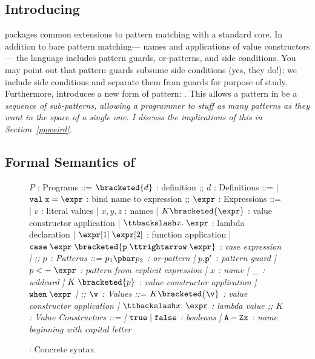 \documentclass[manuscript,screen,review, 12pt, nonacm]{acmart}
\begin{document}
\subsection{Introducing \PPlus}
\label{pplus}

    \PPlus packages common extensions to pattern matching with a standard core.
    In addition to bare pattern matching— names and applications of value
    constructors— the language includes pattern guards, or-patterns, and side
    conditions. You may point out that pattern guards subsume side conditions
    (yes, they do!); we include side conditions and separate them from guards
    for purpose of study. Furthermore, \PPlus introduces a new form of pattern:
    \pcommap. This allows a pattern in \PPlus be a \it{sequence} of
    sub-patterns, allowing a programmer to stuff as many patterns as they want
    in the space of a single one. I discuss the implications of this in
    Section~\ref{ppweird}.

\subsection{Formal Semantics of \PPlus}

\begin{figure}
\begin{center}
\begin{bnf}
$P$ : \textsf{Programs} ::=
$\bracketed{d}$ : definition
;;
$d$ : \textsf{Definitions} ::=
| $\tt{val}\; x\; \tt{=}\; \expr$ : bind name to expression
;;
$\expr$ : Expressions ::= 
| $v$ : literal values 
| $x, y, z$ : names
| $K\bracketed{\expr}$ : value constructor application 
| $\ttbackslash x.\; \expr$ : lambda declaration  
| $\expr[1]\; \expr[2]$ : function application 
| $\tt{case}\; \expr\; \bracketed{p\; \ttrightarrow\; \expr}$ : \it{case} expression 
| \ttbraced{$\expr$}
;;
$p$ : \textsf{Patterns} ::= $p_{1}\pbar p_{2}$ : or-pattern
| $p \tt{,} p'$ : pattern guard 
| $p\; \tt{<-}\; \expr$ : pattern from explicit expression  
| $x$ : name 
| $\tt{\_}$ : wildcard 
| $K\; \bracketed{p}$ : value constructor application 
| $\tt{when}\; \expr$
| 
;;
$\v$ : Values ::= $K\bracketed{\v}$ : value constructor application 
| $\ttbackslash x.\; \expr$ : lambda value 
;;
$K$ : \textsf{Value Constructors} ::=
| $\tt{true}\; \vert\; \tt{false}$ : booleans
| $\tt{A-Z}x$ : name beginning with capital letter
\end{bnf}
\end{center}
\caption{\PPlus: Concrete syntax}
\label{fig:ppsyntax}
\end{figure}
\end{document}
